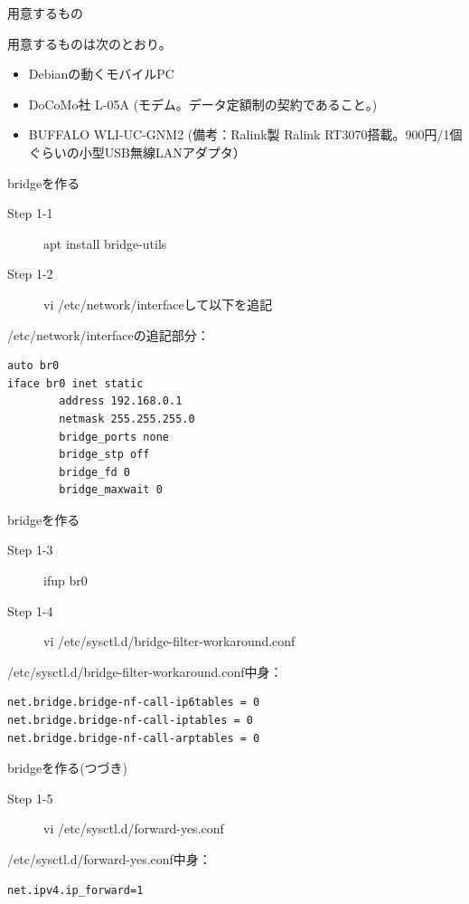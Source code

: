 \begin{frame}{用意するもの}

  用意するものは次のとおり。

  \begin{itemize}
  \item Debianの動くモバイルPC
  \item DoCoMo社 L-05A (モデム。データ定額制の契約であること。)
  \item BUFFALO WLI-UC-GNM2 (備考：Ralink製 Ralink RT3070搭載。900円/1個ぐらいの小型USB無線LANアダプタ）
  \end{itemize}    

\end{frame}

\begin{frame}[containsverbatim]{bridgeを作る}

  \begin{description}
    \item [Step 1-1] apt install bridge-utils
    \item [Step 1-2] vi /etc/network/interfaceして以下を追記
  \end{description}      
 /etc/network/interfaceの追記部分：
\begin{verbatim}
auto br0
iface br0 inet static
        address 192.168.0.1
        netmask 255.255.255.0
        bridge_ports none
        bridge_stp off
        bridge_fd 0
        bridge_maxwait 0
\end{verbatim}  

\end{frame}

\begin{frame}[containsverbatim]{bridgeを作る}

  \begin{description}
    \item [Step 1-3] ifup br0
    \item [Step 1-4] vi /etc/sysctl.d/bridge-filter-workaround.conf
  \end{description}      
/etc/sysctl.d/bridge-filter-workaround.conf中身：
\begin{verbatim}
net.bridge.bridge-nf-call-ip6tables = 0
net.bridge.bridge-nf-call-iptables = 0
net.bridge.bridge-nf-call-arptables = 0
\end{verbatim}  
\end{frame}

\begin{frame}[containsverbatim]{bridgeを作る(つづき)}

  \begin{description}
    \item [Step 1-5] vi /etc/sysctl.d/forward-yes.conf
  \end{description}      
 /etc/sysctl.d/forward-yes.conf中身：
\begin{verbatim}
net.ipv4.ip_forward=1
\end{verbatim}  
\end{frame}

